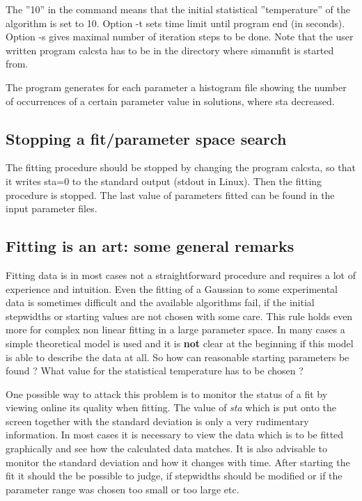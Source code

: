 The ''10'' in the command means that the initial statistical
''temperature'' of the algorithm
is set to 10.  
Option -t sets time limit until program end (in seconds).
Option -s gives maximal number of iteration steps to be done.
Note that the user written program {\prg calcsta} has to be in the
directory where {\prg simannfit} is started from.

The program generates for each parameter a histogram file showing the number of occurrences
of a certain parameter value in solutions, where sta decreased.

\subsection{Stopping a fit/parameter space search}

The fitting procedure should be stopped by changing the program {\prg calcsta}, so that it
writes {\prg sta=0} to the standard output (stdout in Linux). Then the fitting
procedure is stopped. The last value of parameters fitted can be found in the
input parameter files.

\subsection{Fitting is an art: some general remarks}

Fitting data is in most cases not a straightforward procedure and requires
a lot of experience and intuition. Even the fitting of a Gaussian to some
experimental data is sometimes difficult and the available algorithms fail,
 if the initial
stepwidths or starting values are not chosen with some care.
This rule holds even more for complex non linear fitting in a large
parameter space. In many cases a simple theoretical model is used
and it is {\bf not} clear at the beginning if this model is able
to describe the data at all. 
So how can reasonable starting parameters be found ? What value
for the statistical temperature has to be chosen ?

One possible way to attack this problem is to monitor the status of a fit
by viewing online its quality when fitting. The value of {\em sta} which is put onto
the screen together with the standard deviation is only a very rudimentary information.
In most cases it is necessary to view the data which is to be fitted graphically and
see how the calculated data matches. It is also advisable to monitor the
standard deviation and how it changes with time. After starting the
fit it should the be possible to judge, if stepwidths should be modified or if
the parameter range was chosen too small or too large etc.

